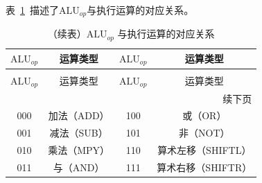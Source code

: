 \documentclass[lang=cn,a4paper,newtx]{elegantpaper}
\begin{document}
表~\ref{tab:aluop}~描述了$\text{ALU}_{op}$与执行运算的对应关系。
\begin{longtable}{c c @{\hskip 2cm} c c}
  \caption{$\text{ALU}_{op}$ 与执行运算的对应关系} \label{tab:aluop} \\
  \toprule
  $\text{ALU}_{op}$ & 运算类型 & $\text{ALU}_{op}$ & 运算类型 \\
  \midrule
  \endfirsthead

  \caption[]{（续表）$\text{ALU}_{op}$ 与执行运算的对应关系} \\
  \toprule
  $\text{ALU}_{op}$ & 运算类型 & $\text{ALU}_{op}$ & 运算类型 \\
  \midrule
  \endhead

  \midrule
  \multicolumn{4}{r}{续下页} \\
  \midrule
  \endfoot

  \bottomrule
  \endlastfoot

  000 & 加法（ADD）       & 100 & 或（OR）         \\
  001 & 减法（SUB）       & 101 & 非（NOT）        \\
  010 & 乘法（MPY）       & 110 & 算术左移（SHIFTL）   \\
  011 & 与（AND）         & 111 & 算术右移（SHIFTR）   \\

\end{longtable}

  
  
  
  
\end{document}
